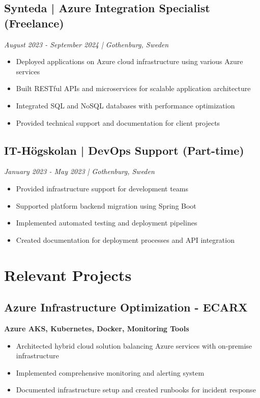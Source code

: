 \documentclass[11pt,a4paper]{article}
\begin{document}
\subsection*{Synteda | Azure Integration Specialist (Freelance)}
\textit{August 2023 - September 2024 | Gothenburg, Sweden}
\begin{itemize}[noitemsep]
\item Deployed applications on Azure cloud infrastructure using various Azure services
\item Built RESTful APIs and microservices for scalable application architecture
\item Integrated SQL and NoSQL databases with performance optimization
\item Provided technical support and documentation for client projects
\end{itemize}

\subsection*{IT-Högskolan | DevOps Support (Part-time)}
\textit{January 2023 - May 2023 | Gothenburg, Sweden}
\begin{itemize}[noitemsep]
\item Provided infrastructure support for development teams
\item Supported platform backend migration using Spring Boot
\item Implemented automated testing and deployment pipelines
\item Created documentation for deployment processes and API integration
\end{itemize}

\section*{Relevant Projects}

\subsection{Azure Infrastructure Optimization - ECARX}
\textbf{Azure AKS, Kubernetes, Docker, Monitoring Tools}
\begin{itemize}[noitemsep]
  \item Architected hybrid cloud solution balancing Azure services with on-premise infrastructure
  \item Implemented comprehensive monitoring and alerting system
  \item Documented infrastructure setup and created runbooks for incident response
\end{itemize}
\end{document}
